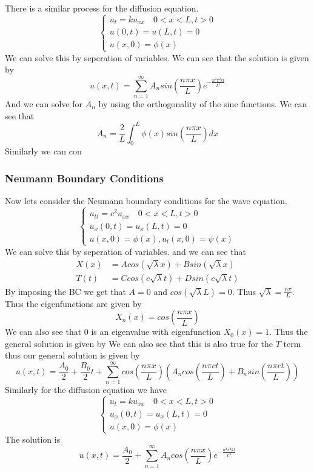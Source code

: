 \documentclass[answers,12pt,addpoints]{exam}
\begin{document}
    There is a similar process for the diffusion equation. 
    $$ \begin{cases}
        u_t = k u_{xx} \quad 0 < x < L, t > 0\\
        u(0, t) = u(L, t) = 0\\
        u(x, 0) = \phi(x)
    \end{cases}$$
    We can solve this by seperation of variables. We can see that the solution is given by
    $$ u(x, t) = \sum_{n=1}^{\infty} A_n sin(\frac{n \pi x}{L}) e^{-\frac{n^2 \pi^2 k t}{L^2}} $$
    And we can solve for $A_n$ by using the orthogonality of the sine functions. We can see that
    $$ A_n = \frac{2}{L} \int_{0}^{L} \phi(x) sin(\frac{n \pi x}{L}) dx$$
    Similarly we can con


    \subsubsection{Neumann Boundary Conditions}
    Now lets consider the Neumann boundary conditions for the wave equation.
    $$ \begin{cases}
        u_{tt} = c^2 u_{xx} \quad 0 < x < L, t > 0\\
        u_x(0, t) = u_x(L, t) = 0\\
        u(x, 0) = \phi(x), u_t(x, 0) = \psi(x)
    \end{cases}$$
    We can solve this by seperation of variables. and we can see that 
    \begin{align*}
        X(x) &= A cos(\sqrt{\lambda} x) + B sin(\sqrt{\lambda} x)\\
        T(t) &= C cos(c \sqrt{\lambda} t) + D sin(c \sqrt{\lambda} t)
    \end{align*}
    By imposing the BC we get that $A = 0$ and $cos(\sqrt{\lambda} L) = 0$. Thus $\sqrt{\lambda} = \frac{n\pi}{L}$. Thus the eigenfunctions are given by
    $$ X_n(x) = cos(\frac{n \pi x}{L})$$
    We can also see that $0$ is an eigenvalue with eigenfunction $X_0(x) = 1$. Thus the general solution is given by
    We can also see that this is also true for the $T$ term thus our general solution is given by
    $$ u(x, t) =  \frac{A_0}{2} + \frac{B_0}{2}t + \sum_{n=1}^{\infty} cos(\frac{n \pi x}{L}) (A_n cos(\frac{n \pi c t}{L}) + B_n sin(\frac{n \pi c t}{L}))$$
    Similarly for the diffusion equation we have
    $$ \begin{cases}
        u_t = k u_{xx} \quad 0 < x < L, t > 0\\
        u_x(0, t) = u_x(L, t) = 0\\
        u(x, 0) = \phi(x)
    \end{cases}$$
    The solution is 
    $$ u(x, t) = \frac{A_0}{2} + \sum_{n=1}^{\infty} A_n cos(\frac{n \pi x}{L}) e^{-\frac{n^2 \pi^2 k t}{L^2}}$$
\end{document}

